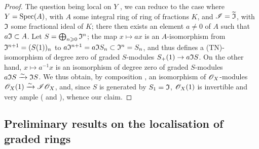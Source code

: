 \begin{proof}
The question being local on $Y$ , we can reduce to the case where $Y=\operatorname{Spec}(A)$, with $A$ some integral ring of ring of fractions $K$, and $\mathscr{I}=\widetilde{\mathfrak{I}}$, with $\mathfrak{I}$ some fractional ideal of $K$;
there then exists an element $a\neq0$ of $A$ such that $a\mathfrak{I}\subset A$.
Let $S = \bigoplus_{n\geqslant0}\mathfrak{I}^n$;
the map $x\mapsto ax$ is an $A$-isomorphism from $\mathfrak{I}^{n+1} = (S(1))_n$ to $a\mathfrak{I}^{n+1} = a\mathfrak{I}S_n \subset \mathfrak{I}^n = S_n$,
and thus defines a (TN)-isomorphism of degree zero of graded $S$-modules $S_+(1)\to a\fk{I}S$.
On the other hand, $x\mapsto a^{-1}x$ is an isomorphism of degree zero of graded $S$-modules $a\mathfrak{I}S \xrightarrow{\sim} \mathfrak{I}S$.
We thus obtain, by composition , an isomorphism of $\mathscr{O}_X$-modules $\mathscr{O}_X(1) \xrightarrow{\sim} \mathscr{I}\mathscr{O}_X$, and, since $S$ is generated by $S_1=\mathfrak{I}$, $\mathscr{O}_X(1)$ is invertible  and very ample ( and ), whence our claim.
\end{proof}


\subsection{Preliminary results on the localisation of graded rings}
\label{subsection:II.8.2}

